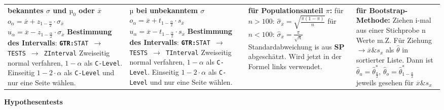 \documentclass[fleqn, oneside, 10pt, titlepage]{article}
\begin{document}
\scriptsize{
\begin{tabularx}{\textwidth}{p{15em}p{15em}p{15em}p{15em}}
\textbf{bekanntes $\sigma$ und $µ_0$ oder $\overline{x}$}\newline
	$o_{\alpha} = \overline{x} + z_{1-\frac{\alpha}{2}} \cdot \sigma_{\overline{x}}$\newline
	$u_{\alpha} = \overline{x} - z_{1-\frac{\alpha}{2}} \cdot \sigma_{\overline{x}}$\newline
	\textbf{Bestimmung des Intervalls}:\newline
	\textbf{\texttt{GTR:}}\texttt{STAT $\rightarrow$ TESTS $\rightarrow$ ZInterval}\newline
	Zweiseitig normal verfahren, $1-\alpha$ als \texttt{C-Level}. Einseitig $1-2\cdot\alpha$ als \texttt{C-Level} und nur eine Seite wählen.
	
 &
\textbf{$µ$ bei unbekanntem $\sigma$}\newline
	$o_{\alpha} = \overline{x} + t_{1-\frac{\alpha}{2}} \cdot s_{\overline{x}}$\newline
	$u_{\alpha} = \overline{x} - t_{1-\frac{\alpha}{2}} \cdot s_{\overline{x}}$\newline
	\textbf{Bestimmung des Intervalls}:\newline
	\textbf{\texttt{GTR:}}\texttt{STAT $\rightarrow$ TESTS $\rightarrow$ TInterval}\newline
	Zweiseitig normal verfahren, $1-\alpha$ als \texttt{C-Level}. Einseitig $1-2\cdot\alpha$ als \texttt{C-Level} und nur eine Seite wählen.
 &
\textbf{für Populationsanteil $\pi$:}\newline
für $n>100$: $\hat{\sigma}_{\overline{x}} = \sqrt{\frac{\pi(1-\pi)}{n}}$\newline
für $n<100$: $\hat{\sigma}_{\overline{x}} = \frac{\pi}{\sqrt{n}}$\newline
Standardabweichung is aus \textbf{SP} abgeschätzt. Wird jetzt in der Formel links verwendet.
&
\textbf{für Bootstrap-Methode:}\newline
Ziehen i-mal aus einer Stichprobe n Werte m.Z. \newline Für Ziehung $\rightarrow \overline{x} \& s_x$ als $\hat\theta$ in sortierter Liste. Dann ist \newline
$\hat\theta_u = \hat\theta^*_{\frac{a}{2}}$, $\hat\theta_o = \hat\theta^*_{1-\frac{a}{2}}$\newline
jeweils gesehen für $\overline{x} \& s_x$
\end{tabularx} 
}
\normalsize
\textbf{Hypothesentests}\\
\end{document}
